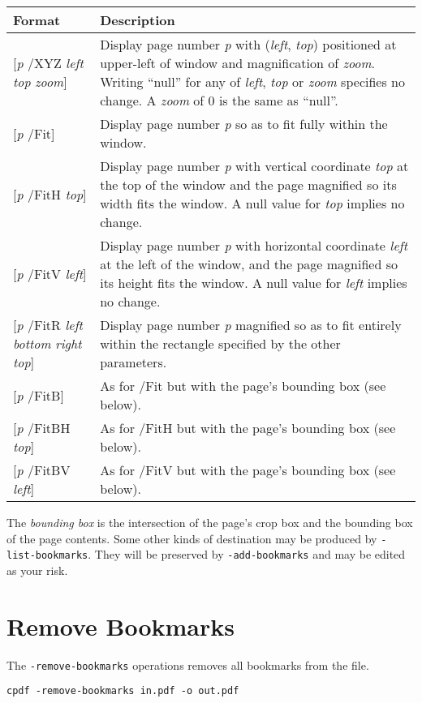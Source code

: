 \documentclass{book}
\begin{document}
\begin{tabular}{lp{8cm}}
Format & Description\\\hline
{[\textit{p} /XYZ \textit{left} \textit{top} \textit{zoom}]} & Display page number \textit{p} with (\textit{left}, \textit{top}) positioned at upper-left of window and magnification of \textit{zoom}. Writing ``null'' for any of \textit{left}, \textit{top} or \textit{zoom} specifies no change. A \textit{zoom} of 0 is the same as ``null''.\\
{[\textit{p} /Fit]} & Display page number \textit{p} so as to fit fully within the window.\\
{[\textit{p} /FitH \textit{top}]} & Display page number \textit{p} with vertical coordinate \textit{top} at the top of the window and the page magnified so its width fits the window. A null value for \textit{top} implies no change.\\
{[\textit{p} /FitV \textit{left}]} & Display page number \textit{p} with horizontal coordinate \textit{left} at the left of the window, and the page magnified so its height fits the window. A null value for \textit{left} implies no change. \\
{[\textit{p} /FitR \textit{left} \textit{bottom} \textit{right} \textit{top}]} & Display page number \textit{p} magnified so as to fit entirely within the rectangle specified by the other parameters. \\
{[\textit{p} /FitB]} & As for /Fit but with the page's bounding box (see below).\\
{[\textit{p} /FitBH \textit{top}]} & As for /FitH but with the page's bounding box (see below).\\
{[\textit{p} /FitBV \textit{left}]} & As for /FitV but with the page's bounding box (see below).
\end{tabular}

\medskip

\noindent The \textit{bounding box} is the intersection of the page's crop box and the bounding box of the page contents. Some other kinds of destination may be produced by \texttt{-list-bookmarks}. They will be preserved by \texttt{-add-bookmarks} and may be edited as your risk.


  \section{Remove Bookmarks}
  \label{removebookmarks}
  The \texttt{-remove-bookmarks} operations removes all bookmarks from the file.
  \begin{framed}
    \small\verb!cpdf -remove-bookmarks in.pdf -o out.pdf!
  \end{framed}
\end{document}
